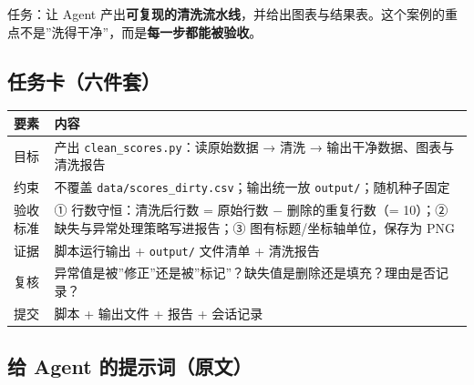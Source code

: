任务：让 Agent
产出\textbf{可复现的清洗流水线}，并给出图表与结果表。这个案例的重点不是''洗得干净''，而是\textbf{每一步都能被验收}。

\subsection{任务卡（六件套）}\label{ux4efbux52a1ux5361ux516dux4ef6ux5957-1}

{\def\LTcaptype{none} %
\begin{longtable}[]{@{}
  >{\raggedright\arraybackslash}p{}
  >{\raggedright\arraybackslash}p{}@{}}
\toprule\noalign{}
\begin{minipage}[b]{\linewidth}\raggedright
要素
\end{minipage} & \begin{minipage}[b]{\linewidth}\raggedright
内容
\end{minipage} \\
\midrule\noalign{}
\endhead
\bottomrule\noalign{}
\endlastfoot
目标 & 产出 \texttt{clean\_scores.py}：读原始数据 → 清洗 →
输出干净数据、图表与清洗报告 \\
约束 & 不覆盖 \texttt{data/scores\_dirty.csv}；输出统一放
\texttt{output/}；随机种子固定 \\
验收标准 & ① 行数守恒：清洗后行数 = 原始行数 − 删除的重复行数（= 10）；②
缺失与异常处理策略写进报告；③ 图有标题/坐标轴单位，保存为 PNG \\
证据 & 脚本运行输出 + \texttt{output/} 文件清单 + 清洗报告 \\
复核 &
异常值是被''修正''还是被''标记''？缺失值是删除还是填充？理由是否记录？ \\
提交 & 脚本 + 输出文件 + 报告 + 会话记录 \\
\end{longtable}
}

\subsection{给 Agent
的提示词（原文）}\label{ux7ed9-agent-ux7684ux63d0ux793aux8bcdux539fux6587-1}

\begin{Shaded}
\begin{Highlighting}[]
\end{Highlighting}
\end{Shaded}

